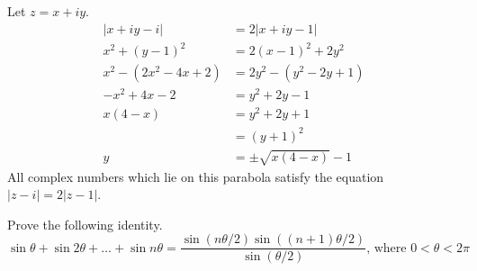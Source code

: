 \documentclass[12pt]{article}
\newenvironment{problem}[2][Problem]{\begin{trivlist}
\item[\hskip \labelsep {\bfseries #1} \hskip \labelsep {\bfseries #2.}]}{\end{trivlist}}
\begin{document}
Let $z = x+iy$.
\begin{align*}
	|x + iy - i| &= 2|x + iy - 1| \\
	x^2 + (y - 1)^2 &= 2(x - 1)^2 + 2y^2 \\
	x^2 - (2x^2 - 4x + 2) &= 2y^2 - (y^2 - 2y + 1) \\
	-x^2 + 4x - 2 &= y^2 + 2y - 1 \\
	x(4-x) &= y^2 + 2y + 1 \\
	&= (y + 1)^2 \\
	y &= \pm\sqrt{x(4 - x)} - 1
\end{align*}
All complex numbers which lie on this parabola satisfy the equation $|z-i| = 2|z - 1|$.
\begin{center}
\end{center}
\begin{problem}{4}
	Prove the following identity.
	\[
		\sin \theta + \sin 2\theta + \ldots + \sin n\theta = \frac{\sin(n\theta/2)\sin((n+1)\theta/2)}{\sin(\theta/2)}\text{, where } 0 < \theta < 2\pi
	\]
\end{problem}
\end{document}
